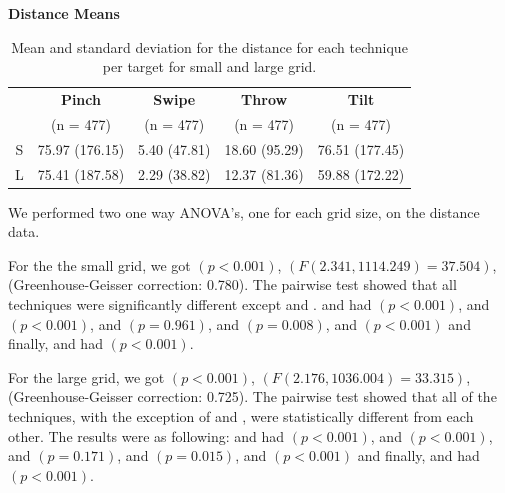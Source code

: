 \begin{table}[H]
	\centering
	\textbf{Distance Means}\\[4pt]
	\begin{adjustbox}{width=\columnwidth}
	\begin{tabular}{|c|c|c|c|c|}
		\hline
		\rowcolor[HTML]{9B9B9B} 
		& \textbf{Pinch} & \textbf{Swipe} & \textbf{Throw} & \textbf{Tilt} \\
		\rowcolor[HTML]{9B9B9B} 
		& (n = 477) & (n = 477) & (n = 477) & (n = 477) \\ \hline
		S & 75.97 (176.15) & 5.40 (47.81) & 18.60 (95.29)  & 76.51  (177.45) \\ \hline
		L & 75.41 (187.58) & 2.29 (38.82) & 12.37 (81.36) & 59.88 (172.22) \\ \hline
	\end{tabular}
	\end{adjustbox}
	\caption{Mean and standard deviation for the distance for each technique per target for small and large grid.}
	\label{tab:distance}
\end{table}

We performed two one way ANOVA's, one for each grid size, on the distance data.

For the the small grid, we got $(p<0.001)$, $(F(2.341, 1114.249)=37.504)$, (Greenhouse-Geisser correction: 0.780).
The pairwise test showed that all techniques were significantly different except \pinch and \tilt. 
\pinch and \swipe had $(p < 0.001)$, 
\pinch and \throw $(p <0.001)$, 
\pinch and \tilt $(p = 0.961)$, 
\swipe and \throw $(p = 0.008)$, 
\swipe and \tilt $(p < 0.001)$ and finally, 
\throw and \tilt had $(p < 0.001)$. 

For the large grid, we got $(p<0.001)$, $(F(2.176, 1036.004)=33.315)$, (Greenhouse-Geisser correction: 0.725).
The pairwise test showed that all of the techniques, with the exception of \pinch and \tilt, were statistically different from each other. The results were as following: 
\pinch and \swipe had $(p < 0.001)$, 
\pinch and \throw $(p <0.001)$, 
\pinch and \tilt $(p = 0.171)$, 
\swipe and \throw $(p = 0.015)$, 
\swipe and \tilt $(p < 0.001)$ and finally, 
\throw and \tilt had $(p < 0.001)$. 

